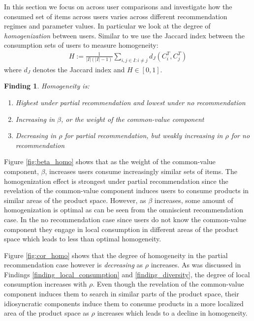 \documentclass[sigconf]{acmart}
\newtheorem{finding}{Finding}
\begin{document}
In this section we focus on across user comparisons and investigate how the consumed set of items across users varies across different recommendation regimes and parameter values. In particular we look at the degree of \textit{homogenization} between users. Similar to \cite{chaney2018algorithmic} we use the Jaccard index between the consumption sets of users to measure homogeneity:
\begin{align*}
H:=\frac{1}{|I|(|I|-1)}\sum_{i,j \in I: i \ne j}d_J(C_i^T,C_j^T)
\end{align*}
where $d_J$ denotes the Jaccard index and $H \in [0,1]$.
\begin{finding}\label{finding_homogeneity}
Homogeneity is:
\begin{enumerate}
\item Highest under partial recommendation and lowest under no recommendation
\item Increasing in $\beta$, or the weight of the common-value component
\item Decreasing in $\rho$ for partial recommendation, but weakly increasing in $\rho$ for no recommendation
\end{enumerate}
\end{finding}

Figure \ref{fig:beta_homo} shows that as the weight of the common-value component, $\beta$, increases users consume increasingly similar sets of items. The homogenization effect is strongest under partial recommendation since the revelation of the common-value component induces users to consume products in similar areas of the product space. However, as $\beta$ increases, some amount of homogenization is optimal as can be seen from the omniscient recommendation case. In the no recommendation case since users do not know the common-value component they engage in local consumption in different areas of the product space which leads to less than optimal homogeneity.

Figure \ref{fig:cor_homo} shows that the degree of homogeneity in the partial recommendation case however is \textit{decreasing} as $\rho$ increases. As was discussed in Findings \ref{finding_local_consumption} and \ref{finding_diversity}, the degree of local consumption increases with $\rho$. Even though the revelation of the common-value component induces them to search in similar parts of the product space, their idiosyncratic components induce them to consume products in a more localized area of the product space as $\rho$ increases which leads to a decline in homogeneity.
\end{document}
